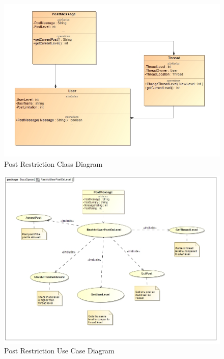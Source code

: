 \documentclass[11pt]{article}
\begin{document}
\begin{enumerate}
\begin{itemize}
	 \graphicspath{ {../Diagrams/Andrew/} }
			\begin{figure}[H]	
			  	\includegraphics[scale=0.5]{B1ClassDiagram.png}
				\caption{Post Restriction Class Diagram}
			\end{figure}
			
			\begin{figure}[H]	
			 	\includegraphics[scale=0.5]{B1UseCase.png}
				\caption{Post Restriction Use Case Diagram}
			\end{figure}


\end{itemize}
\end{enumerate}
\end{document}

